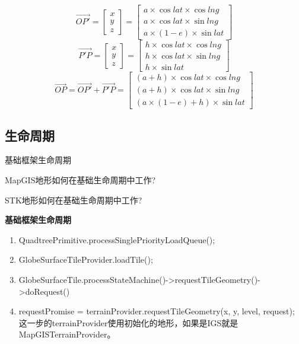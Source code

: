 \begin{equation}
	\overrightarrow{OP'} = \begin{bmatrix} x \\[0.3em] y \\[0.3em] z  \end{bmatrix} = 
	\begin{bmatrix} a \times{} \cos{lat} \times{} \cos{lng}  \\[0.3em]
	a \times{} \cos{lat} \times{} \sin{lng} \\[0.3em]
	a \times{} ( 1 - e) \times{} \sin{lat} \end{bmatrix}	
\end{equation}
\begin{equation}
	\overrightarrow{P'P} = \begin{bmatrix} x \\[0.3em] y \\[0.3em] z  \end{bmatrix} = 
	\begin{bmatrix} h \times{} \cos{lat} \times{} \cos{lng}  \\[0.3em]
	h \times{} \cos{lat} \times{} \sin{lng} \\[0.3em]
	h \times{} \sin{lat} \end{bmatrix}	
\end{equation}	
\begin{equation}
	\overrightarrow{OP} = \overrightarrow{OP'} + \overrightarrow{P'P} = 
	\begin{bmatrix} (a + h) \times{} \cos{lat} \times{} \cos{lng}  \\[0.3em]
		(a + h) \times{} \cos{lat} \times{} \sin{lng} \\[0.3em]
		(a \times{} ( 1 - e) + h) \times{} \sin{lat} \end{bmatrix}	
\end{equation}	

\subsection{生命周期}
\begin{introduction}
	\item 基础框架生命周期
	\item MapGIS地形如何在基础生命周期中工作?
	\item STK地形如何在基础生命周期中工作?
\end{introduction}

\textbf{基础框架生命周期}

\begin{enumerate}
	\item QuadtreePrimitive.processSinglePriorityLoadQueue();
	\item GlobeSurfaceTileProvider.loadTile();
	\item GlobeSurfaceTile.processStateMachine()->requestTileGeometry()->doRequest()
	\item requestPromise = terrainProvider.requestTileGeometry(x, y, level, request); 这一步的terrainProvider使用初始化的地形，如果是IGS就是MapGISTerrainProvider。
\end{enumerate}

